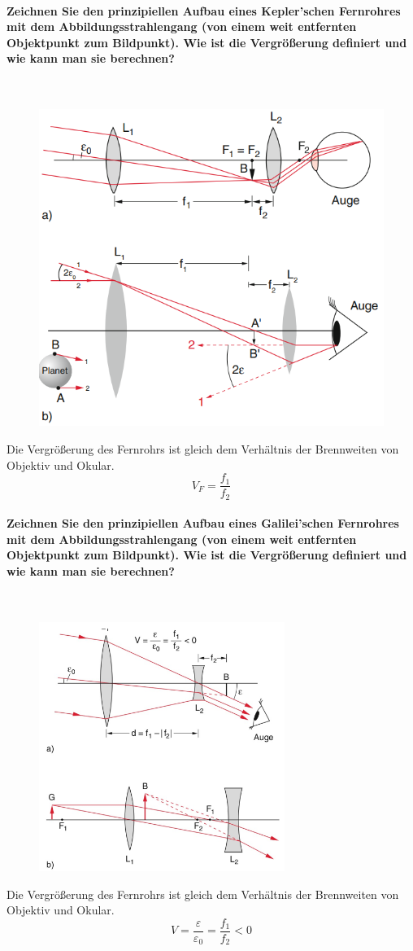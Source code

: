 \documentclass[a4paper, 11pt, ngerman, parskip=half-]{scrartcl}
\begin{document}
\paragraph{Zeichnen Sie den prinzipiellen Aufbau eines Kepler'schen Fernrohres mit dem
    Abbildungsstrahlengang (von einem weit entfernten Objektpunkt zum Bildpunkt). Wie ist die
    Vergrößerung definiert und wie kann man sie berechnen?} ~
\begin{figure}[H]
    \centering
    \includegraphics[width=0.4\linewidth]{image/20/7.png}
\end{figure}
Die Vergrößerung des Fernrohrs ist gleich dem Verhältnis der Brennweiten von Objektiv und Okular.
\begin{equation}
    V_F = \frac{f_1}{f_2}
\end{equation}

\paragraph{Zeichnen Sie den prinzipiellen Aufbau eines Galilei'schen Fernrohres mit dem
    Abbildungsstrahlengang (von einem weit entfernten Objektpunkt zum Bildpunkt). Wie ist die
    Vergrößerung definiert und wie kann man sie berechnen?} ~

\begin{figure}[H]
    \centering
    \includegraphics[width=8cm]{image/20/8.png}
\end{figure}
Die Vergrößerung des Fernrohrs ist gleich dem Verhältnis der Brennweiten von Objektiv und Okular.
\begin{equation}
    V = \frac{\varepsilon}{\varepsilon_0} = \frac{f_1}{f_2} < 0
\end{equation}
\end{document}
